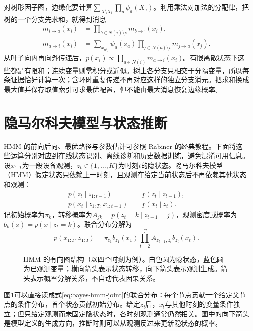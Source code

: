 对树形因子图，边缘化要计算$\sum_{X\setminus X_i}\prod_a\psi_a(X_a)$。利用乘法对加法的分配律，把树的一个分支先求和，就得到消息
\begin{align}
 m_{i\to a}(x_i)&=\prod_{b\in N(i)\setminus a}m_{b\to i}(x_i),\\
 m_{a\to i}(x_i)&=\sum_{x_{a\setminus i}}\psi_a(x_a)
                  \prod_{j\in N(a)\setminus i}m_{j\to a}(x_j).
\end{align}
从叶子向内再向外传递后，$p(x_i)\propto\prod_{a\in N(i)}m_{a\to i}(x_i)$。有限离散状态下这些都是有限和；连续变量则需积分或近似。树上各分支只相交于分隔变量，所以每条证据恰好计算一次；含环时重复传递不再对应这样的独立分支消元。把求和换成最大值并保存取值索引可求最优配置，但不能由最大消息恢复边缘概率。

\section{隐马尔科夫模型与状态推断}
HMM 的前向后向、最优路径与参数估计可参照 Rabiner 的经典教程\cite{rabiner1989hmm}。下面将这些运算分别对应到在线状态识别、离线诊断和历史数据训练，避免混淆可用信息。
设$x_{1:T}$为一段设备观测，$z_t\in\{1,\ldots,K\}$为时刻$t$的隐状态。隐马尔科夫模型（HMM）假定状态只依赖上一时刻，且观测在给定当前状态后不再依赖其他状态和观测：
\begin{align}
 p(z_t\mid z_{1:t-1})&=p(z_t\mid z_{t-1}),\\
 p(x_t\mid z_{1:T},x_{1:t-1})&=p(x_t\mid z_t).
\end{align}
记初始概率为$\pi_k$，转移概率为$A_{jk}=p(z_t=k\mid z_{t-1}=j)$，观测密度或概率为$b_k(x)=p(x\mid z_t=k)$。联合分布分解为
\begin{equation}
 p(x_{1:T},z_{1:T})=\pi_{z_1}b_{z_1}(x_1)
 \prod_{t=2}^{T}A_{z_{t-1},z_t}b_{z_t}(x_t).\label{eq:bayes-hmm-joint}
\end{equation}
\begin{figure}[htbp]
\centering
{}
\caption{HMM 的有向图结构（以四个时刻为例）。白色圆为隐状态，蓝色圆为已观测变量；横向箭头表示状态转移，向下箭头表示观测生成。箭头表示概率分解关系，不自动代表因果关系。}
\label{fig:bayes-hmm-structure}
\end{figure}
图\ref{fig:bayes-hmm-structure}可以直接读成式\eqref{eq:bayes-hmm-joint}的联合分布：每个节点贡献一个给定父节点的条件分布，首个状态贡献初始分布。给定$z_t$后，$x_t$与其他时刻的变量条件独立；但只给定观测而未固定隐状态时，各时刻观测通常仍然相关。图中的向下箭头是模型定义的生成方向，推断时则可以从观测反过来更新隐状态的概率。

